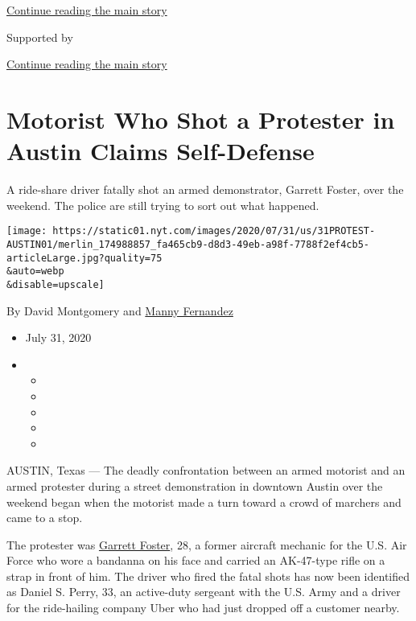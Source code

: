 \protect\hyperlink{after-top}{Continue reading the main story}

Supported by

\protect\hyperlink{after-sponsor}{Continue reading the main story}

\hypertarget{motorist-who-shot-a-protester-in-austin-claims-self-defense}{%
\section{Motorist Who Shot a Protester in Austin Claims
Self-Defense}\label{motorist-who-shot-a-protester-in-austin-claims-self-defense}}

A ride-share driver fatally shot an armed demonstrator, Garrett Foster,
over the weekend. The police are still trying to sort out what happened.

\texttt{[image: https://static01.nyt.com/images/2020/07/31/us/31PROTEST-AUSTIN01/merlin\_174988857\_fa465cb9-d8d3-49eb-a98f-7788f2ef4cb5-articleLarge.jpg?quality=75\\\&auto=webp\\\&disable=upscale]}

By David Montgomery and
\href{https://www.nytimes.com/by/manny-fernandez}{Manny Fernandez}

\begin{itemize}
\item
  July 31, 2020
\item
  \begin{itemize}
  \item
  \item
  \item
  \item
  \item
  \end{itemize}
\end{itemize}

AUSTIN, Texas --- The deadly confrontation between an armed motorist and
an armed protester during a street demonstration in downtown Austin over
the weekend began when the motorist made a turn toward a crowd of
marchers and came to a stop.

The protester was
\href{https://www.nytimes.com/2020/07/26/us/austin-shooting-texas-protests.html}{Garrett
Foster}, 28, a former aircraft mechanic for the U.S. Air Force who wore
a bandanna on his face and carried an AK-47-type rifle on a strap in
front of him. The driver who fired the fatal shots has now been
identified as Daniel S. Perry, 33, an active-duty sergeant with the U.S.
Army and a driver for the ride-hailing company Uber who had just dropped
off a customer nearby.

